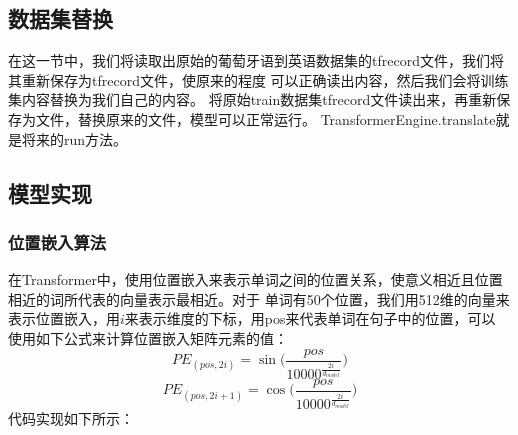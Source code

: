 \documentclass{article}
\begin{document}
\subsection{数据集替换}
在这一节中，我们将读取出原始的葡萄牙语到英语数据集的tfrecord文件，我们将其重新保存为tfrecord文件，使原来的程度
可以正确读出内容，然后我们会将训练集内容替换为我们自己的内容。\newline
将原始train数据集tfrecord文件读出来，再重新保存为文件，替换原来的文件，模型可以正常运行。\newline
TransformerEngine.translate就是将来的run方法。
\subsection{模型实现}
\subsubsection{位置嵌入算法}
在Transformer中，使用位置嵌入来表示单词之间的位置关系，使意义相近且位置相近的词所代表的向量表示最相近。对于
单词有50个位置，我们用512维的向量来表示位置嵌入，用$i$来表示维度的下标，用pos来代表单词在句子中的位置，可以
使用如下公式来计算位置嵌入矩阵元素的值：
\begin{equation}
PE_{(pos, 2i)}=\sin{ \bigg( \frac{pos}{10000^{ \frac{2i}{d_{model}} }} \bigg) }
\label{e000104}
\end{equation}
\begin{equation}
PE_{(pos, 2i+1)}=\cos{ \bigg( \frac{pos}{10000^{ \frac{2i}{d_{model}} }} \bigg) }
\label{e000104}
\end{equation}
代码实现如下所示：
\end{document}
